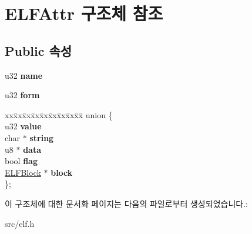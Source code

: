 \hypertarget{struct_e_l_f_attr}{}\section{E\+L\+F\+Attr 구조체 참조}
\label{struct_e_l_f_attr}
\subsection*{Public 속성}
\begin{DoxyCompactItemize}
\item 
\mbox{\label{struct_e_l_f_attr_aae677b759e5864de3ec3948837a65700}} 
u32 {\bfseries name}
\item 
\mbox{\label{struct_e_l_f_attr_a21299233079c1bb24e10eea813f6f1b6}} 
u32 {\bfseries form}
\item 
\mbox{\label{struct_e_l_f_attr_a1aa1501a9a9ab1d25817c77736aeba90}} 
\begin{tabbing}
xx\=xx\=xx\=xx\=xx\=xx\=xx\=xx\=xx\=\kill
union \{\\
\>u32 {\bfseries value}\\
\>char $\ast$ {\bfseries string}\\
\>u8 $\ast$ {\bfseries data}\\
\>bool {\bfseries flag}\\
\>\mbox{\hyperlink{struct_e_l_f_block}{ELFBlock}} $\ast$ {\bfseries block}\\
\}; \\

\end{tabbing}\end{DoxyCompactItemize}


이 구조체에 대한 문서화 페이지는 다음의 파일로부터 생성되었습니다.\+:\begin{DoxyCompactItemize}
\item 
src/elf.\+h\end{DoxyCompactItemize}
